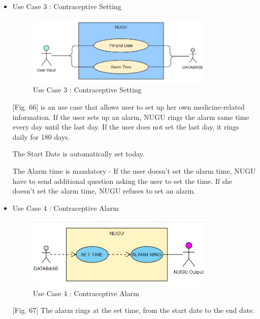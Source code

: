 \documentclass[conference]{IEEEtran}
\begin{document}
\begin{itemize}
   \setlength{\parindent}{2ex} When a user asks about ovulation date, NUGU answers. 
    
    \setlength{\parindent}{2ex}As fig.12, Action B, asking for ovulation dates for a specific period of time informs the ovulation dates for that period, or the ovulation dates that are approaching.
    \item Use Case 3 : Contraceptive Setting
    
    \begin{figure}[ht]
    \includegraphics[width=9cm, center]{pillset.PNG}
    \caption{Use Case 3 : Contraceptive Setting}
    \label{fig66}
    \end{figure}
    \setlength{\parindent}{2ex} [Fig. 66] is an use case that allows user to set up her own medicine-related information. If the user sets up an alarm, NUGU rings the alarm same time every day until the last day. If the user does not set the last day, it rings daily for 180 days.
    
   \setlength{\parindent}{2ex} The Start Date is automatically set today.
   
    \setlength{\parindent}{2ex} The Alarm time is mandatory - If the user doesn't set the alarm time, NUGU have to send additional question asking the user to set the time. If she doesn't set the alarm time, NUGU refuses to set an alarm. 
    
    \item Use Case 4 : Contraceptive Alarm
    
    \begin{figure}[ht]
    \includegraphics[width=9cm, center]{pillalarm.PNG}
    \caption{Use Case 4 : Contraceptive Alarm}
    \label{fig67}
    \end{figure}
    \setlength{\parindent}{2ex} [Fig. 67] The alarm rings at the set time, from the start date to the end date. 
    

\end{itemize}
\end{document}
